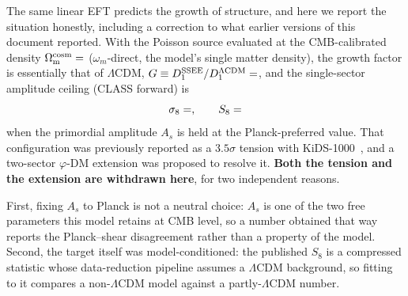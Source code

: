 \documentclass[aps,prd,preprint,amsmath,amssymb,nofootinbib,longbibliography]{revtex4-2}
\newcommand{\Om}{\Omega_{\mathrm{m}}}
\begin{document}
The same linear EFT predicts the growth of structure, and here we report the
situation honestly, including a correction to what earlier versions of this document reported. With the Poisson source evaluated at the CMB-calibrated density $\Om^{\mathrm{cosm}}=\val{OMEGA_M_TOTAL_d6}$ ($\omega_m$-direct, the model's single matter density), the growth factor is essentially that of $\Lambda$CDM,
$G\equiv D_1^{\rm SSEE}/D_1^{\Lambda\rm CDM}=\val{p5_G}$, and the
single-sector amplitude ceiling (CLASS forward) is
\begin{equation}
  \label{eq:s8}
  \sigma_8=\val{p3_sigma8_techo} , \qquad S_8=\val{p3_S8_techo}
\end{equation}
when the primordial amplitude $A_s$ is held at the Planck-preferred value.
That configuration was previously reported as a $3.5\sigma$ tension with
KiDS-1000~\citep{KiDS2021,DESY32022}, and a two-sector $\varphi$-DM extension
was proposed to resolve it. \textbf{Both the tension and the extension are
withdrawn here}, for two independent reasons.

First, fixing $A_s$ to Planck is not a neutral choice: $A_s$ is one of the two
free parameters this model retains at CMB level, so a number obtained that way
reports the Planck--shear disagreement rather than a property of the model.
Second, the target itself was model-conditioned: the published $S_8$
is a compressed statistic whose data-reduction pipeline assumes a $\Lambda$CDM
background, so fitting to it compares a non-$\Lambda$CDM model against a
partly-$\Lambda$CDM number.
\end{document}
